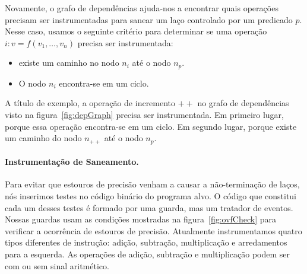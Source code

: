 \documentclass{llncs}
\begin{document}
Novamente, o grafo de dependências ajuda-nos a encontrar quais operações
precisam ser instrumentadas para sanear um laço controlado por um
predicado $p$.
Nesse caso, usamos o seguinte critério para determinar se uma operação
$i : v = f(v_1, \ldots, v_n)$ precisa ser instrumentada:
%
\begin{itemize}
\item existe um caminho no nodo $n_i$ até o nodo $n_p$.
\item O nodo $n_i$ encontra-se em um ciclo.
\end{itemize}
%
A título de exemplo, a operação de incremento $++$ no grafo de dependências
visto na figura~\ref{fig:depGraph} precisa ser instrumentada.
Em primeiro lugar, porque essa operação encontra-se em um ciclo.
Em segundo lugar, porque existe um caminho do nodo $n_{++}$ até o nodo
$n_p$.

\paragraph{Instrumentação de Saneamento. }
Para evitar que estouros de precisão venham a causar a não-terminação
de laços, nós inserimos testes no código binário do programa alvo.
O código que constitui cada um desses testes é formado por uma guarda, mas
um tratador de eventos.
Nossas guardas usam as condições mostradas na figura~\ref{fig:ovfCheck} para
verificar a ocorrência de estouros de precisão.
Atualmente instrumentamos quatro tipos diferentes de instrução:
adição, subtração, multiplicação e arredamentos para a esquerda.
As operações de adição, subtração e multiplicação podem ser com ou sem sinal
aritmético.
\end{document}
